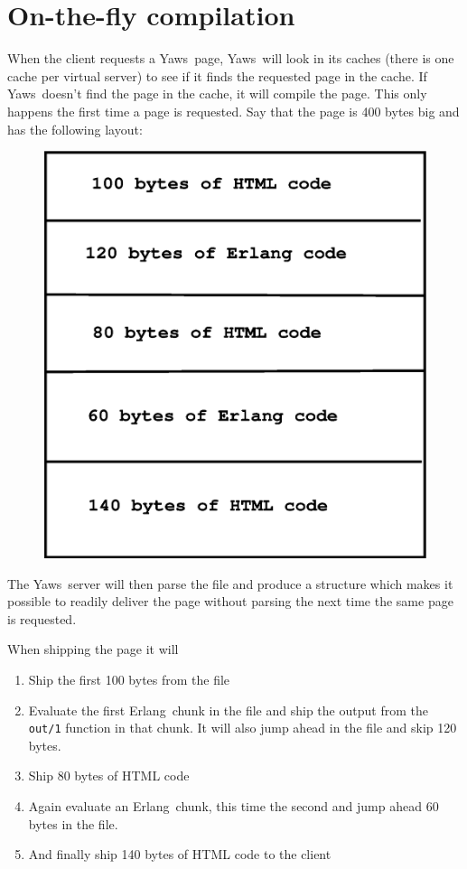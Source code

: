 \documentclass[11pt,oneside,english]{book}
\newcommand{\Erlang}            %
        {{\sc Erlang}}
\newcommand{\Yaws}            %
        {{\sc Yaws}}
\begin{document}
\section{On-the-fly compilation}
When the client requests a \Yaws\ page, \Yaws\ will look in its caches
(there is one cache per virtual server) to see if it finds the
requested page in the cache. If \Yaws\ doesn't find the page in the
cache, it will compile the page. This only happens the first time a
page is requested.  Say that the page is 400 bytes big and has the
following layout:


\begin{figure}[h]
\begin{center}

 \includegraphics[scale=0.4] {layout}

\end{center}
\end{figure}

The \Yaws\ server will then parse the file and produce a structure
which makes it possible to readily deliver the page without parsing
the next time the same page is requested.

When shipping the page it will
\begin{enumerate}
\item Ship the first 100 bytes from the file
\item Evaluate the first \Erlang\  chunk in the file and ship the output
from the \verb+out/1+ function in that chunk. It will also jump ahead
in the file and skip 120 bytes.
\item Ship 80 bytes of HTML code
\item Again evaluate an \Erlang\  chunk, this time the second and jump
ahead 60 bytes in the file.
\item And finally ship 140 bytes of HTML code to the client
\end{enumerate}
\end{document}
